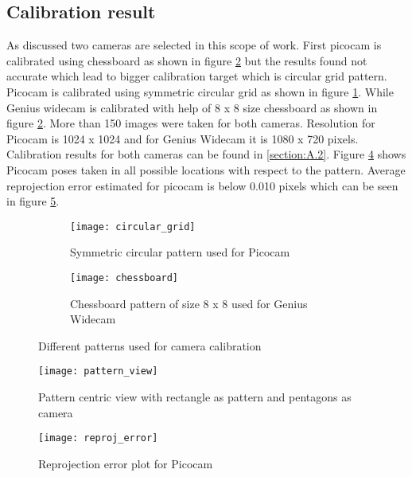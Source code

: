 \subsection{Calibration result}
As discussed two cameras are selected in this scope of work. First picocam is calibrated using chessboard as shown in figure \ref{fig:chessboard} but the results found not accurate which lead to bigger calibration target which is circular grid pattern. Picocam is calibrated using symmetric circular grid as shown in figure \ref{fig:circular_grid}. While Genius widecam is calibrated with help of 8 x 8 size chessboard as shown in figure \ref{fig:chessboard}. More than 150 images were taken for both cameras. Resolution for Picocam is 1024 x 1024 and for Genius Widecam it is 1080 x 720 pixels. Calibration results for both cameras can be found in \ref{section:A.2}. Figure \ref{fig:pattern_view} shows Picocam poses taken in all possible locations with respect to the pattern. Average reprojection error estimated for picocam is below 0.010 pixels which can be seen in figure \ref{fig:reproj}.\\
\begin{figure}[h!]
	\begin{subfigure}{0.5\textwidth}
		\centering
		\texttt{[image: circular\_grid]}
		\caption{Symmetric circular pattern used for Picocam}
		\label{fig:circular_grid}
	\end{subfigure}%
	\begin{subfigure}{0.5\textwidth}
		\centering
		\texttt{[image: chessboard]}
		\caption{Chessboard pattern of size 8 x 8 used for Genius Widecam}
		\label{fig:chessboard}
	\end{subfigure}
	\caption{Different patterns used for camera calibration}
	\label{fig:patterns}
\end{figure}
\begin{figure}[h!]
	\centering
	\texttt{[image: pattern\_view]}
	\caption{Pattern centric view with rectangle as pattern and pentagons as camera}
	\label{fig:pattern_view}
\end{figure}
\begin{figure}[h!]
	\centering
	\texttt{[image: reproj\_error]}
	\caption{Reprojection error plot for Picocam}
	\label{fig:reproj}
\end{figure}